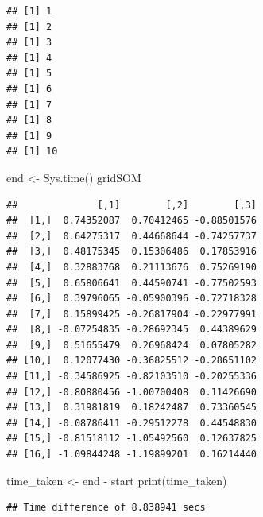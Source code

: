 \documentclass[
]{article}
\newenvironment{Shaded}{\begin{snugshade}}{\end{snugshade}}
\newcommand{\FunctionTok}[1]{\textcolor[rgb]{0.00,0.00,0.00}{#1}}
\newcommand{\NormalTok}[1]{#1}
\newcommand{\OtherTok}[1]{\textcolor[rgb]{0.56,0.35,0.01}{#1}}
\newcommand{\SpecialCharTok}[1]{\textcolor[rgb]{0.00,0.00,0.00}{#1}}
\begin{document}
\begin{verbatim}
## [1] 1
## [1] 2
## [1] 3
## [1] 4
## [1] 5
## [1] 6
## [1] 7
## [1] 8
## [1] 9
## [1] 10
\end{verbatim}

\begin{Shaded}
\begin{Highlighting}[]
\NormalTok{end }\OtherTok{\textless{}{-}} \FunctionTok{Sys.time}\NormalTok{()}
\NormalTok{gridSOM}
\end{Highlighting}
\end{Shaded}

\begin{verbatim}
##              [,1]        [,2]        [,3]
##  [1,]  0.74352087  0.70412465 -0.88501576
##  [2,]  0.64275317  0.44668644 -0.74257737
##  [3,]  0.48175345  0.15306486  0.17853916
##  [4,]  0.32883768  0.21113676  0.75269190
##  [5,]  0.65806641  0.44590741 -0.77502593
##  [6,]  0.39796065 -0.05900396 -0.72718328
##  [7,]  0.15899425 -0.26817904 -0.22977991
##  [8,] -0.07254835 -0.28692345  0.44389629
##  [9,]  0.51655479  0.26968424  0.07805282
## [10,]  0.12077430 -0.36825512 -0.28651102
## [11,] -0.34586925 -0.82103510 -0.20255336
## [12,] -0.80880456 -1.00700408  0.11426690
## [13,]  0.31981819  0.18242487  0.73360545
## [14,] -0.08786411 -0.29512278  0.44548830
## [15,] -0.81518112 -1.05492560  0.12637825
## [16,] -1.09844248 -1.19899201  0.16214440
\end{verbatim}

\begin{Shaded}
\begin{Highlighting}[]
\NormalTok{time\_taken }\OtherTok{\textless{}{-}}\NormalTok{ end }\SpecialCharTok{{-}}\NormalTok{ start}
\FunctionTok{print}\NormalTok{(time\_taken)}
\end{Highlighting}
\end{Shaded}

\begin{verbatim}
## Time difference of 8.838941 secs
\end{verbatim}
\end{document}
